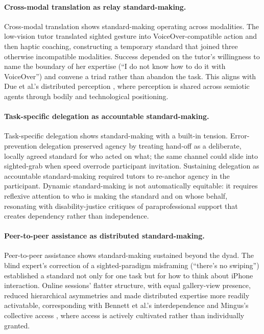 \paragraph{Cross-modal translation as relay standard-making.}
Cross-modal translation shows standard-making operating across modalities. The low-vision tutor translated sighted gesture into VoiceOver-compatible action and then haptic coaching, constructing a temporary standard that joined three otherwise incompatible modalities. Success depended on the tutor's willingness to name the boundary of her expertise (``I do not know how to do it with VoiceOver'') and convene a triad rather than abandon the task. This aligns with Due et al.'s distributed perception \cite{due_distributed_2021}, where perception is shared across semiotic agents through bodily and technological positioning.

\paragraph{Task-specific delegation as accountable standard-making.}
Task-specific delegation shows standard-making with a built-in tension. Error-prevention delegation preserved agency by treating hand-off as a deliberate, locally agreed standard for who acted on what; the same channel could slide into sighted-grab when speed overrode participant invitation. Sustaining delegation as accountable standard-making required tutors to re-anchor agency in the participant. Dynamic standard-making is not automatically equitable: it requires reflexive attention to who is making the standard and on whose behalf, resonating with disability-justice critiques of paraprofessional support that creates dependency rather than independence.

\paragraph{Peer-to-peer assistance as distributed standard-making.}
Peer-to-peer assistance shows standard-making sustained beyond the dyad. The blind expert's correction of a sighted-paradigm misframing (``there's no swiping'') established a standard not only for one task but for how to think about iPhone interaction. Online sessions' flatter structure, with equal gallery-view presence, reduced hierarchical asymmetries and made distributed expertise more readily activatable, corresponding with Bennett et al.'s interdependence \cite{bennett_interdependence_2018} and Mingus's collective access \cite{mia_mingus_access_2017}, where access is actively cultivated rather than individually granted.

